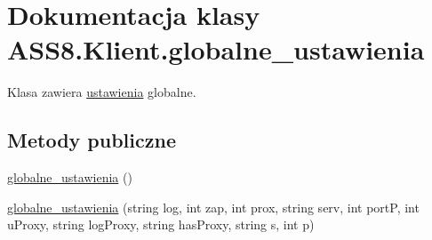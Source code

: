 \hypertarget{a00006}{
\section{Dokumentacja klasy ASS8.Klient.globalne\_\-ustawienia}
\label{de/d21/a00006}
}
Klasa zawiera \hyperlink{a00028}{ustawienia} globalne.  


\subsection*{Metody publiczne}
\begin{CompactItemize}
\item 
\hyperlink{a00006_3c6e77468b75fe3323a0b4ed40c41414}{globalne\_\-ustawienia} ()
\item 
\hyperlink{a00006_f9fcc3d7f2fcb1db3992ff5598f0f5c2}{globalne\_\-ustawienia} (string log, int zap, int prox, string serv, int portP, int uProxy, string logProxy, string hasProxy, string s, int p)
\end{CompactItemize}
